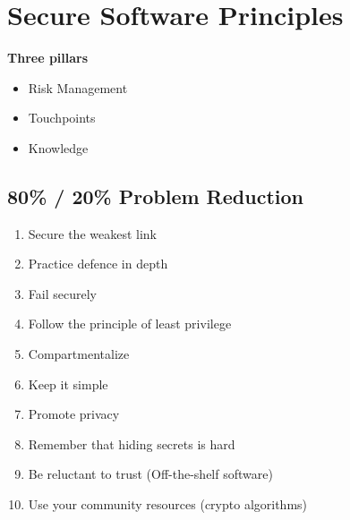 
\section{Secure Software Principles}
\textbf{Three pillars}
\begin{itemize}
    \item Risk Management
    \item Touchpoints
    \item Knowledge
\end{itemize}

\subsection{80\% / 20\% Problem Reduction}
\begin{enumerate}
    \item Secure the weakest link
    \item Practice defence in depth
    \item Fail securely
    \item Follow the principle of least privilege
    \item Compartmentalize
    \item Keep it simple
    \item Promote privacy
    \item Remember that hiding secrets is hard
    \item Be reluctant to trust (Off-the-shelf software)
    \item Use your community resources (crypto algorithms)
\end{enumerate}


